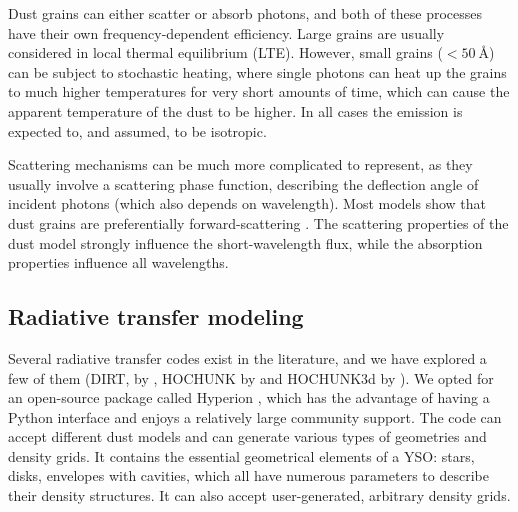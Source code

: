 Dust grains can either scatter or absorb photons, and both of these processes have their own frequency-dependent efficiency. Large grains are usually considered in local thermal equilibrium (LTE). However, small grains ($<\SI{50}{\angstrom}$) can be subject to stochastic heating, where single photons can heat up the grains to much higher temperatures for very short amounts of time, which can cause the apparent temperature of the dust to be higher. In all cases the emission is expected to, and assumed, to be isotropic.

Scattering mechanisms can be much more complicated to represent, as they usually involve a scattering phase function, describing the deflection angle of incident photons (which also depends on wavelength). Most models show that dust grains are preferentially forward-scattering  \citep{Draine:2011tr}. The scattering properties of the dust model strongly influence the short-wavelength flux, while the absorption properties influence all wavelengths. 

%
%

\subsection{Radiative transfer modeling}
\label{subsubsec:radiative}

Several radiative transfer codes exist in the literature, and we have explored a few of them (DIRT, by \citet{Wolfire:1986fw}, HOCHUNK by \citet{Whitney:2003ke} and HOCHUNK3d by \citet{Whitney:2013cw}). We opted for an open-source package called Hyperion \citep{Robitaille:2011fc}, which has the advantage of having a Python interface and enjoys a relatively large community support. The code can accept different dust models and can generate various types of geometries and density grids. It contains the essential geometrical elements of a YSO: stars, disks, envelopes with cavities, which all have numerous parameters to describe their density structures. It can also accept user-generated, arbitrary density grids.

